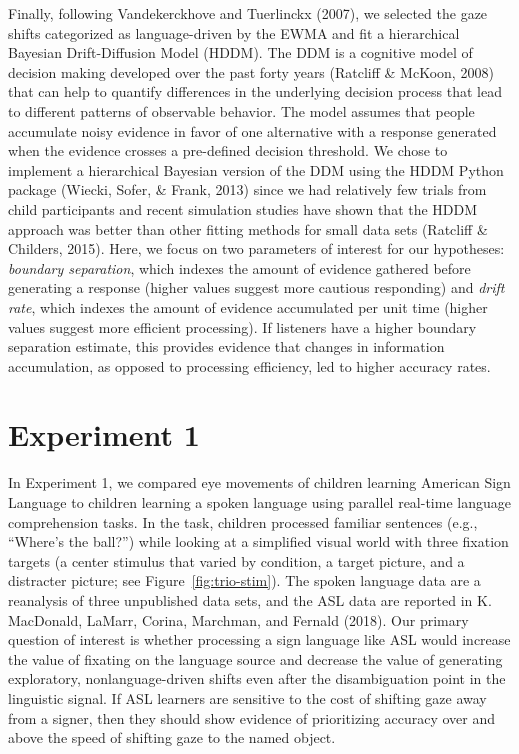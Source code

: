 \documentclass[,man,floatsintext]{apa6}
\begin{document}
Finally, following Vandekerckhove and Tuerlinckx (2007), we selected the
gaze shifts categorized as language-driven by the EWMA and fit a
hierarchical Bayesian Drift-Diffusion Model (HDDM). The DDM is a
cognitive model of decision making developed over the past forty years
(Ratcliff \& McKoon, 2008) that can help to quantify differences in the
underlying decision process that lead to different patterns of
observable behavior. The model assumes that people accumulate noisy
evidence in favor of one alternative with a response generated when the
evidence crosses a pre-defined decision threshold. We chose to implement
a hierarchical Bayesian version of the DDM using the HDDM Python package
(Wiecki, Sofer, \& Frank, 2013) since we had relatively few trials from
child participants and recent simulation studies have shown that the
HDDM approach was better than other fitting methods for small data sets
(Ratcliff \& Childers, 2015). Here, we focus on two parameters of
interest for our hypotheses: \emph{boundary separation}, which indexes
the amount of evidence gathered before generating a response (higher
values suggest more cautious responding) and \emph{drift rate}, which
indexes the amount of evidence accumulated per unit time (higher values
suggest more efficient processing). If listeners have a higher boundary
separation estimate, this provides evidence that changes in information
accumulation, as opposed to processing efficiency, led to higher
accuracy rates.

\section{Experiment 1}\label{experiment-1}

In Experiment 1, we compared eye movements of children learning American
Sign Language to children learning a spoken language using parallel
real-time language comprehension tasks. In the task, children processed
familiar sentences (e.g., \enquote{Where's the ball?}) while looking at
a simplified visual world with three fixation targets (a center stimulus
that varied by condition, a target picture, and a distracter picture;
see Figure~\ref{fig:trio-stim}). The spoken language data are a
reanalysis of three unpublished data sets, and the ASL data are reported
in K. MacDonald, LaMarr, Corina, Marchman, and Fernald (2018). Our
primary question of interest is whether processing a sign language like
ASL would increase the value of fixating on the language source and
decrease the value of generating exploratory, nonlanguage-driven shifts
even after the disambiguation point in the linguistic signal. If ASL
learners are sensitive to the cost of shifting gaze away from a signer,
then they should show evidence of prioritizing accuracy over and above
the speed of shifting gaze to the named object.
\end{document}
